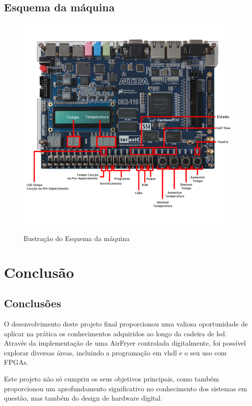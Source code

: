 \documentclass[a4paper, 11pt, onecolumn, oneside]{report}
\begin{document}
\section{Esquema da máquina}
\begin{figure}[H]
    \centering
    \includegraphics[width=\textwidth]{images/FPGA_Ilustrada.jpg}
    \caption{Ilustração do Esquema da máquina}
    \label{fig:fpga}
\end{figure}


\chapter{Conclusão}
\section{Conclusões}
O desenvolvimento deste projeto final proporcionou uma valiosa oportunidade de aplicar na prática os conhecimentos adquiridos ao longo da cadeira de \ac{lsd}. Através da implementação de uma AirFryer controlada digitalmente, foi possível explorar diversas áreas, incluindo a programação em \ac{vhdl} e o  seu uso com FPGAs.

Este projeto não só cumpriu os seus objetivos principais, como também proporcionou um aprofundamento significativo no conhecimento dos sistemas em questão, mas também do design de hardware digital. 
\end{document}
